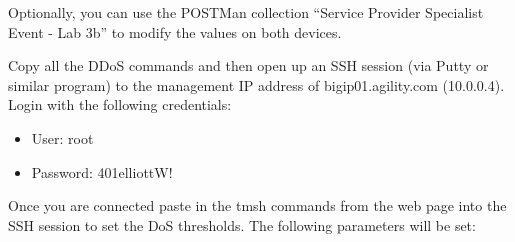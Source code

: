 \documentclass[letterpaper,10pt,english]{sphinxmanual}
\begin{document}

Optionally, you can use the POSTMan collection “Service Provider
Specialist Event - Lab 3b” to modify the values on both devices.

Copy all the DDoS commands and then open up an SSH session (via Putty or
similar program) to the management IP address of bigip01.agility.com
(10.0.0.4). Login with the following credentials:
\begin{itemize}
\item {} 
User: root

\item {} 
Password: 401elliottW!

\end{itemize}

Once you are connected paste in the tmsh commands from the web page into
the SSH session to set the DoS thresholds. The following parameters will
be set:
\end{document}
